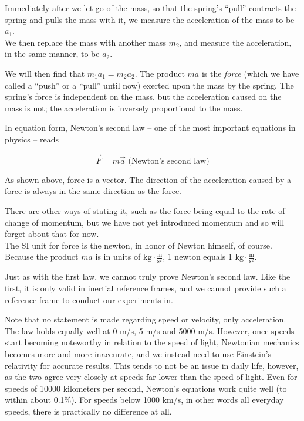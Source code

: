 Immediately after we let go of the mass, so that the spring's ``pull'' contracts the spring and pulls the mass with it, we measure the acceleration of the mass to be $a_1$.\\
We then replace the mass with another mass $m_2$, and measure the acceleration, in the same manner, to be $a_2$.

We will then find that $m_1 a_1 = m_2 a_2$. The product $m a$ is the \emph{force} (which we have called a ``push'' or a ``pull'' until now) exerted upon the mass by the spring. The spring's force is independent on the mass, but the acceleration caused on the mass is not; the acceleration is inversely proportional to the mass.

In equation form, Newton's second law -- one of the most important equations in physics -- reads

\begin{equation}
\vec{F} = m \vec{a} \text{ (Newton's second law)} \label{eq:newton2}
\end{equation}

As shown above, force is a vector. The direction of the acceleration caused by a force is always in the same direction as the force.

There are other ways of stating it, such as the force being equal to the rate of change of momentum, but we have not yet introduced momentum and so will forget about that for now.\\
The SI unit for force is the newton, in honor of Newton himself, of course. Because the product $m a$ is in units of $\displaystyle \text{kg} \cdot \frac{\text{m}}{\text{s}^2}$, 1 newton equals 1 $\displaystyle \text{kg} \cdot \frac{\text{m}}{\text{s}^2}$.

Just as with the first law, we cannot truly prove Newton's second law. Like the first, it is only valid in inertial reference frames, and we cannot provide such a reference frame to conduct our experiments in.

Note that no statement is made regarding speed or velocity, only acceleration. The law holds equally well at 0 m/s, 5 m/s and 5000 m/s. However, once speeds start becoming noteworthy in relation to the speed of light, Newtonian mechanics becomes more and more inaccurate, and we instead need to use Einstein's relativity for accurate results. This tends to not be an issue in daily life, however, as the two agree very closely at speeds far lower than the speed of light. Even for speeds of 10000 kilometers per second, Newton's equations work quite well (to within about 0.1\%). For speeds below 1000 km/s, in other words all everyday speeds, there is practically no difference at all.


